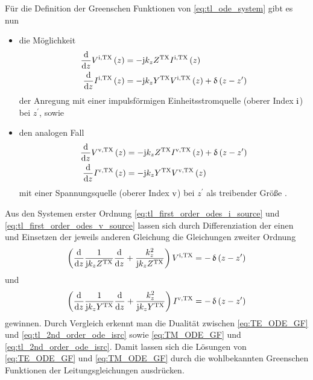 Für die Definition der Greenschen Funktionen von \eqref{eq:tl_ode_system} gibt
es nun
\begin{itemize}
	\item die Möglichkeit
	\begin{subequations}\label{eq:tl_first_order_odes_i_source}
		\begin{align}
			\frac{\mathrm{d}}{\mathrm{d} z} V^{\mathrm{i},\mathrm{TX}}\left(z\right)
			&= -\mathrm{j} k_z Z^{\mathrm{TX}} I^{\mathrm{i},\mathrm{TX}}\left(z\right) \label{eq:tl_first_order_odes_i_source_homo}\\
			\frac{\mathrm{d}}{\mathrm{d} z} I^{\mathrm{i},\mathrm{TX}}\left(z\right)
			&=-\mathrm{j} k_z Y^{\mathrm{TX}} V^{\mathrm{i},\mathrm{TX}}\left(z\right) + \operatorname{\updelta}\left(z-z^\prime\right)
		\end{align}
	\end{subequations}
	der Anregung mit einer impulsförmigen Einheitsstromquelle (oberer Index
	$\mathrm{i}$) bei $z^\prime$, sowie 
	\item den analogen Fall
	\begin{subequations}\label{eq:tl_first_order_odes_v_source}
		\begin{align}
			\frac{\mathrm{d}}{\mathrm{d} z} V^{\mathrm{v},\mathrm{TX}}\left(z\right)
			&= -\mathrm{j} k_z Z^{\mathrm{TX}} I^{\mathrm{v},\mathrm{TX}}\left(z\right) + \operatorname{\updelta}\left(z-z^\prime\right) \\
			\frac{\mathrm{d}}{\mathrm{d} z} I^{\mathrm{v},\mathrm{TX}}\left(z\right)
			&=-\mathrm{j} k_z Y^{\mathrm{TX}} V^{\mathrm{v},\mathrm{TX}}\left(z\right) \label{eq:tl_first_order_odes_v_source_homo}
		\end{align}
	\end{subequations}
	 mit einer Spannungsquelle (oberer Index $\mathrm{v}$) bei $z^\prime$ als
	 treibender Größe \cite{Michalski2016b}.
\end{itemize}
Aus den Systemen erster Ordnung \eqref{eq:tl_first_order_odes_i_source} und
\eqref{eq:tl_first_order_odes_v_source} lassen sich durch Differenziation der
einen und Einsetzen der jeweils anderen Gleichung die Gleichungen zweiter
Ordnung
\begin{equation}\label{eq:tl_2nd_order_ode_isrc}
	\left(\frac{\mathrm{d}}{\mathrm{d} z}
	\frac{1}{\mathrm{j} k_z Z^{\mathrm{TX}}}
	\frac{\mathrm{d}}{\mathrm{d} z} +
	\frac{k_z^2}{\mathrm{j} k_z Z^{\mathrm{TX}}}\right)
	V^{\mathrm{i},\mathrm{TX}} =
	-\operatorname{\updelta}\left(z-z^\prime\right)
\end{equation}
und
\begin{equation}\label{eq:tl_2nd_order_ode_vsrc}
	\left(\frac{\mathrm{d}}{\mathrm{d} z}
	\frac{1}{\mathrm{j} k_z Y^{\mathrm{TX}}}
	\frac{\mathrm{d}}{\mathrm{d} z} +
	\frac{k_z^2}{\mathrm{j} k_z Y^{\mathrm{TX}}}\right)
	I^{\mathrm{v},\mathrm{TX}} =
	-\operatorname{\updelta}\left(z-z^\prime\right)
\end{equation}
gewinnen.
Durch Vergleich erkennt man die Dualität zwischen \eqref{eq:TE_ODE_GF} und
\eqref{eq:tl_2nd_order_ode_isrc} sowie \eqref{eq:TM_ODE_GF} und
\eqref{eq:tl_2nd_order_ode_isrc}.
Damit lassen sich die Lösungen von \eqref{eq:TE_ODE_GF} und \eqref{eq:TM_ODE_GF}
durch die wohlbekannten Greenschen Funktionen der Leitungsgleichungen ausdrücken.

